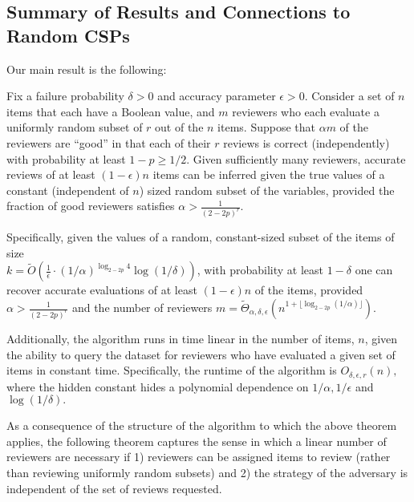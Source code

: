 \documentclass[final,12pt]{colt2018}
\newcommand{\eps}{\epsilon}
\begin{document}

\subsection{Summary of Results and Connections to Random CSPs}\label{sec:sum}

Our main result is the following:
\begin{theorem}\label{thm:m}
Fix a failure probability $\delta>0$ and accuracy parameter $\eps > 0$.  Consider a set of $n$ items that each have a Boolean value, and $m$ reviewers who each evaluate a uniformly random subset of $r$ out of the $n$ items.  Suppose that $\alpha m$ of the reviewers are ``good'' in that each of their $r$ reviews is correct (independently) with probability at least $1-p\ge 1/2$.  Given sufficiently many reviewers, accurate reviews of at least $(1-\eps)n$ items can be inferred given the true values of a constant (independent of $n$) sized random subset of the variables, provided the fraction of good reviewers satisfies $\alpha >\frac{1}{(2-2p)^r}$.

Specifically, given the values of a random, constant-sized subset of the items of size \\$k=\tilde{O}\left(\frac{1}{\eps}\cdot (1/\alpha)^{\log_{2-2p} 4} \log(1/\delta)\right)$, with probability at least $1-\delta$  one can recover accurate evaluations of at least $(1-\eps)n$ of the items, provided $\alpha > \frac{1}{(2- 2p)^r}$ and the number of reviewers $m= \tilde{\Theta}_{\alpha,\delta,\eps}\left(n^{1+\lfloor \log_{2-2p}(1/\alpha)\rfloor}\right)$.  

Additionally, the algorithm runs in time linear in the number of items, $n$, given the ability to query the dataset for reviewers who have evaluated a given set of items in constant time.  Specifically, the runtime of the algorithm is $O_{\delta,\eps,r}(n),$ where the hidden constant hides a polynomial dependence on $1/\alpha, 1/\eps$ and $\log(1/\delta).$
\end{theorem}

As a consequence of the structure of the algorithm to which the above theorem applies, the following theorem captures the sense in which a linear number of reviewers are necessary if 1) reviewers can be assigned items to review (rather than reviewing uniformly random subsets) and 2) the strategy of the adversary is independent of the set of reviews requested.
\end{document}
